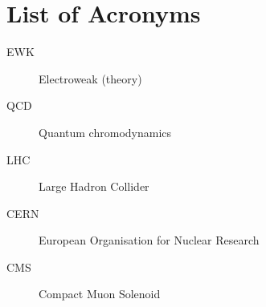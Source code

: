 \chapter{List of Acronyms}

  \begin{description}

    \item[EWK]		\dotfill	Electroweak (theory)
    \item[QCD]		\dotfill	Quantum chromodynamics
    \item[LHC]		\dotfill	Large Hadron Collider
    \item[CERN]		\dotfill	European Organisation for Nuclear Research
    \item[CMS]		\dotfill	Compact Muon Solenoid


  \end{description}
